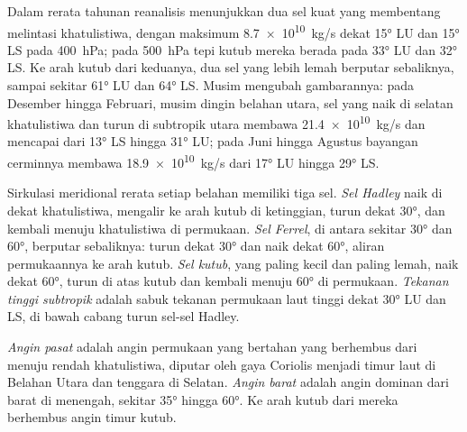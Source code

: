 Dalam rerata tahunan reanalisis menunjukkan dua sel kuat yang membentang melintasi khatulistiwa, dengan maksimum \qty{8.7e10}{kg/s} dekat \ang{15} LU dan \ang{15} LS pada \qty{400}{hPa}; pada \qty{500}{hPa} tepi kutub mereka berada pada \ang{33} LU dan \ang{32} LS. Ke arah kutub dari keduanya, dua sel yang lebih lemah berputar sebaliknya, sampai sekitar \ang{61} LU dan \ang{64} LS. Musim mengubah gambarannya: pada Desember hingga Februari, musim dingin belahan utara, sel yang naik di selatan khatulistiwa dan turun di subtropik utara membawa \qty{21.4e10}{kg/s} dan mencapai dari \ang{13} LS hingga \ang{31} LU; pada Juni hingga Agustus bayangan cerminnya membawa \qty{18.9e10}{kg/s} dari \ang{17} LU hingga \ang{29} LS.

\begin{definition}\label{def:b1:atmospheric-circulation:cells}
Sirkulasi meridional rerata setiap belahan memiliki tiga sel. \emph{Sel Hadley} naik di dekat khatulistiwa, mengalir ke arah kutub di ketinggian, turun dekat \ang{30}, dan kembali menuju khatulistiwa di permukaan. \emph{Sel Ferrel}, di antara sekitar \ang{30} dan \ang{60}, berputar sebaliknya: turun dekat \ang{30} dan naik dekat \ang{60}, aliran permukaannya ke arah kutub. \emph{Sel kutub}, yang paling kecil dan paling lemah, naik dekat \ang{60}, turun di atas kutub dan kembali menuju \ang{60} di permukaan. \emph{Tekanan tinggi subtropik} adalah sabuk tekanan permukaan laut tinggi dekat \ang{30} LU dan LS, di bawah cabang turun sel-sel Hadley.
\end{definition}

\begin{definition}\label{def:b1:atmospheric-circulation:winds}
\emph{Angin pasat} adalah angin permukaan yang bertahan yang berhembus dari  menuju rendah khatulistiwa, diputar oleh gaya Coriolis menjadi timur laut di Belahan Utara dan tenggara di Selatan. \emph{Angin barat} adalah angin dominan dari barat di  menengah, sekitar \ang{35} hingga \ang{60}. Ke arah kutub dari mereka berhembus angin timur kutub.
\end{definition}

